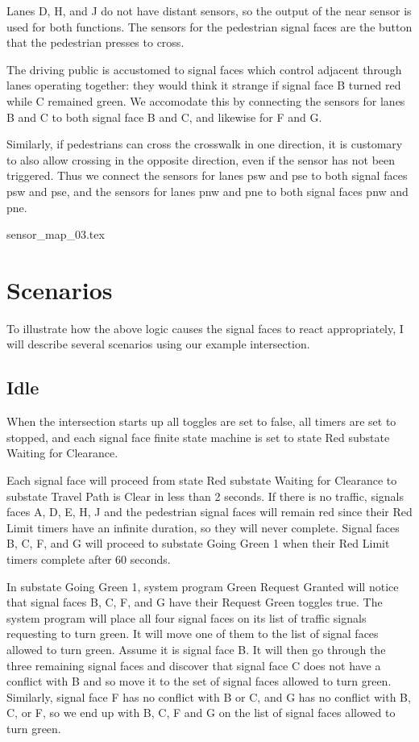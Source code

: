 \documentclass[letterpaper,twoside]{article}
\begin{document}
Lanes D, H, and J do not have distant sensors, so the output
of the near sensor is used for both functions.  The sensors
for the pedestrian signal faces are the button that the pedestrian presses
to cross.

The driving public is accustomed to signal faces which control
adjacent through lanes operating together: they would think it strange
if signal face B turned red while C remained green.  We accomodate this
by connecting the sensors for lanes B and C to both signal face B
and C, and likewise for F and G.

Similarly, if pedestrians can cross the crosswalk in one direction,
it is customary to also allow crossing in the opposite direction,
even if the sensor has not been triggered.  Thus we connect the sensors
for lanes psw and pse to both signal faces psw and pse, and the sensors
for lanes pnw and pne to both signal faces pnw and pne.

 {sensor_map_03.tex}

\section{Scenarios}

To illustrate how the above logic causes the signal faces to react
appropriately, I will describe several scenarios using our example
intersection.

\subsection{Idle}

When the intersection starts up all toggles are set to false,
all timers are set to stopped, and each signal face finite state machine
is set to state Red substate Waiting for Clearance.

Each signal face will proceed
from state Red substate Waiting for Clearance to substate Travel Path is Clear
in less than 2 seconds.
If there is no traffic, signals faces A, D, E, H, J and the pedestrian
signal faces will remain red
since their Red Limit timers have an infinite duration, so they will never
complete.
Signal faces B, C, F, and G will proceed to substate Going Green 1 when
their Red Limit timers complete after 60 seconds.

In substate Going Green 1, system program Green Request Granted will notice
that signal faces B, C, F, and G have their Request Green toggles true.
The system program will place all four signal faces on its list of traffic
signals requesting to turn green.  It will move one of them to the list
of signal faces allowed to turn green.  Assume it is signal face B.
It will then go through the three
remaining signal faces and discover that signal face C does not have
a conflict with B and so move it to the set of signal faces allowed
to turn green.  Similarly, signal face F has no conflict with B or C,
and G has no conflict with B, C, or F, so we end up with B, C, F and G
on the list of signal faces allowed to turn green.
\end{document}
